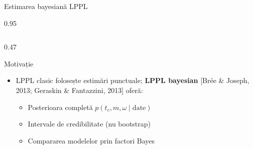 \documentclass[9pt, aspectratio=169, t]{beamer}
\begin{document}
\begin{frame}{Estimarea bayesiană LPPL}
    \begin{cminipage}{0.95\textwidth}
    {\scriptsize
    \begin{columns}[T]
        \begin{column}{0.47\textwidth}
            \begin{block}{Motivație}
                \begin{itemize}\setlength{\itemsep}{0pt}
                    \item LPPL clasic folosește estimări punctuale; \textbf{LPPL bayesian} [Brée \& Joseph, 2013; Geraskin \& Fantazzini, 2013] oferă:
                    \begin{itemize}\setlength{\itemsep}{0pt}
                        \item Posterioara completă $p(t_c, m, \omega \mid \text{date})$
                        \item Intervale de credibilitate (nu bootstrap)
                        \item Compararea modelelor prin factori Bayes
                    \end{itemize}
                \end{itemize}
            \end{block}


\end{column}
\end{columns}}
\end{cminipage}
\end{frame}
\end{document}
